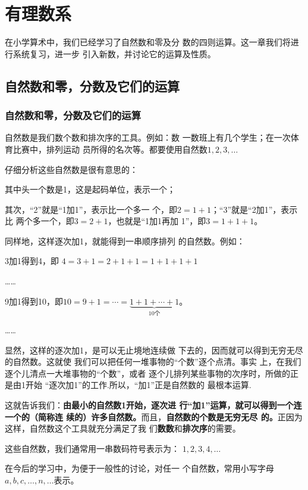 \chapter{有理数系}

    在小学算术中，我们已经学习了自然数和零及分
数的四则运算。这一章我们将进行系统复习，进一步
引入新数，并讨论它的运算及性质。

\section{自然数和零，分数及它们的运算}

\subsection{自然数和零，分数及它们的运算}

自然数是我们数个数和排次序的工具。例如：数
一数班上有几个学生；在一次体育比赛中，排列运动
员所得的名次等。都要使用自然数$1,  2,  3,\ldots$

    仔细分析这些自然数是很有意思的：
    
    其中头一个数是1，这是起码单位，表示一个；

    其次，“2”就是“1加1”，表示比一个多一
个，即$2=1+1$；“3”就是“2加1”，表示比
两个多一个，即$3=2+1$，也就是“1加1再加
1”，即$3=1+1+1$。

    同样地，这样逐次加1，就能得到一串顺序排列
的自然数。例如：  

3加1得到4，即
$4=3+1=2+1+1=1+1+1+1$

……

9加1得到10，即$10= 9+1=\cdots=\underbrace{1+1+\cdots+1}_{10\text{个}}$。

……

显然，这样的逐次加1，是可以无止境地连续做
下去的，因而就可以得到无穷无尽的自然数。这就使
我们可以把任何一堆事物的“个数”逐个点清。事实
上，在我们逐个儿清点一大堆事物的“个数”，或者
逐个儿排列某些事物的次序时，所做的正是由1开始
“逐次加1”的工作.所以，“加1”正是自然数的
最根本运算.

    这就告诉我们：\textbf{由最小的自然数1开始，逐次进
行“加1”运算，就可以得到一个连一个的（简称连
续的）许多自然数。}而且，\textbf{自然数的个数是无穷无尽
的。}正因为这样，自然数这个工具就充分满足了我
们\textbf{数数}和\textbf{排次序}的需要。

这些自然数，我们通常用一串数码符号表示为：
$1,2,3,4,\ldots$

在今后的学习中，为便于一般性的讨论，对任一
个自然数，常用小写字母$a,b,c,\ldots,n,\ldots$表示。

